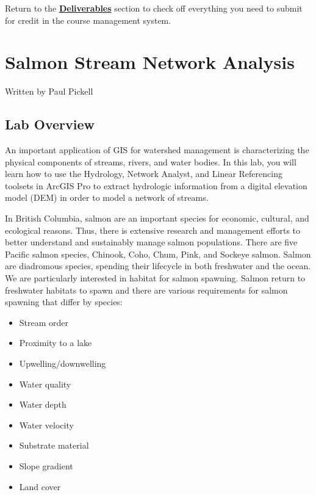 \documentclass[
]{book}
\begin{document}
Return to the \protect\hyperlink{lab1-deliverables}{\textbf{Deliverables}} section to check off everything you need to submit for credit in the course management system.

\hypertarget{network-analysis}{%
\chapter{Salmon Stream Network Analysis}\label{network-analysis}}

Written by
Paul Pickell

\hypertarget{lab-overview-1}{%
\section*{Lab Overview}\label{lab-overview-1}}

An important application of GIS for watershed management is characterizing the physical components of streams, rivers, and water bodies. In this lab, you will learn how to use the Hydrology, Network Analyst, and Linear Referencing toolsets in ArcGIS Pro to extract hydrologic information from a digital elevation model (DEM) in order to model a network of streams.

In British Columbia, salmon are an important species for economic, cultural, and ecological reasons. Thus, there is extensive research and management efforts to better understand and sustainably manage salmon populations. There are five Pacific salmon species, Chinook, Coho, Chum, Pink, and Sockeye salmon. Salmon are diadromous species, spending their lifecycle in both freshwater and the ocean. We are particularly interested in habitat for salmon spawning. Salmon return to freshwater habitats to spawn and there are various requirements for salmon spawning that differ by species:

\begin{itemize}
\item
  Stream order
\item
  Proximity to a lake
\item
  Upwelling/downwelling
\item
  Water quality
\item
  Water depth
\item
  Water velocity
\item
  Substrate material
\item
  Slope gradient
\item
  Land cover
\end{itemize}
\end{document}
